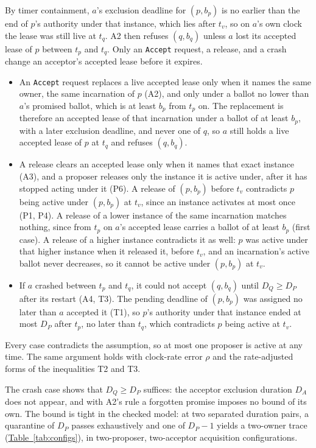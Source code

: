 \documentclass[final,5p,times,twocolumn,number]{elsarticle}
\newcommand{\code}[1]{\texttt{#1}}
\newcommand{\tabref}[1]{\hyperref[#1]{Table~\ref*{#1}}}
\begin{document}
By timer containment, $a$'s exclusion deadline for $(p, b_p)$ is no earlier than the end of $p$'s authority under that instance, which lies after $t_v$, so on $a$'s own clock the lease was still live at $t_q$.  A2 then refuses $(q, b_q)$ unless $a$ lost its accepted lease of $p$ between $t_p$ and $t_q$.  Only an \code{Accept} request, a release, and a crash change an acceptor's accepted lease before it expires.
\begin{itemize}\itemsep0.25em
\item An \code{Accept} request replaces a live accepted lease only when it names the same owner, the same incarnation of $p$ (A2), and only under a ballot no lower than $a$'s promised ballot, which is at least $b_p$ from $t_p$ on.  The replacement is therefore an accepted lease of that incarnation under a ballot of at least $b_p$, with a later exclusion deadline, and never one of $q$, so $a$ still holds a live accepted lease of $p$ at $t_q$ and refuses $(q, b_q)$.
\item A release clears an accepted lease only when it names that exact instance (A3), and a proposer releases only the instance it is active under, after it has stopped acting under it (P6).  A release of $(p, b_p)$ before $t_v$ contradicts $p$ being active under $(p, b_p)$ at $t_v$, since an instance activates at most once (P1, P4).  A release of a lower instance of the same incarnation matches nothing, since from $t_p$ on $a$'s accepted lease carries a ballot of at least $b_p$ (first case).  A release of a higher instance contradicts it as well: $p$ was active under that higher instance when it released it, before $t_v$, and an incarnation's active ballot never decreases, so it cannot be active under $(p, b_p)$ at $t_v$.
\item If $a$ crashed between $t_p$ and $t_q$, it could not accept $(q, b_q)$ until $D_Q \geq D_P$ after its restart (A4, T3).  The pending deadline of $(p, b_p)$ was assigned no later than $a$ accepted it (T1), so $p$'s authority under that instance ended at most $D_P$ after $t_p$, no later than $t_q$, which contradicts $p$ being active at $t_v$.
\end{itemize}
Every case contradicts the assumption, so at most one proposer is active at any time.  The same argument holds with clock-rate error $\rho$ and the rate-adjusted forms of the inequalities T2 and T3.

The crash case shows that $D_Q \geq D_P$ suffices: the acceptor exclusion duration $D_A$ does not appear, and with A2's rule a forgotten promise imposes no bound of its own.  The bound is tight in the checked model: at two separated duration pairs, a quarantine of $D_P$ passes exhaustively and one of $D_P - 1$ yields a two-owner trace (\tabref{tab:configs}), in two-proposer, two-acceptor acquisition configurations.
\end{document}
